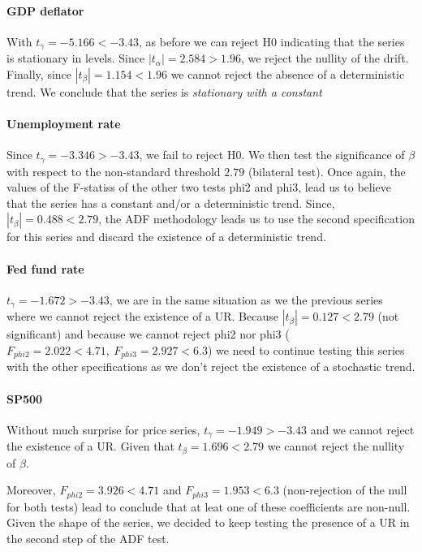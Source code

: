 \documentclass[hidelinks,12pts]{article}
\DeclareMathOperator{\1}{\mathbbm{1}}
\begin{document}
\paragraph{GDP deflator}
With $t_\gamma = -5.166 < -3.43$, as before we can reject H0 indicating that the series is stationary in levels. 
Since $|t_\alpha| = 2.584 > 1.96$, we reject the nullity of the drift. 
Finally, since $|t_\beta| = 1.154 < 1.96$ we cannot reject the absence of a deterministic trend.  
We conclude that the series is \emph{stationary with a constant}


\paragraph{Unemployment rate}
Since $t_\gamma = -3.346 > -3.43$, we fail to reject H0. We then test the significance of $\beta$ with respect to the non-standard threshold $2.79$ (bilateral test).
Once again, the values of the F-statiss of the other two tests phi2 and phi3, lead us to believe that the series has a constant and/or a deterministic trend. 
Since, $|t_\beta| = 0.488 < 2.79$, the ADF methodology leads us to use the second specification for this series and discard the existence of a deterministic trend. 



\paragraph{Fed fund rate}  
$t_\gamma = -1.672 > -3.43$, we are in the same situation as we the previous series where we cannot reject the existence of a UR. 
Because $|t_\beta| = 0.127 < 2.79$ (not significant) and because we cannot reject phi2 nor phi3 ($F_{phi2} = 2.022 <4.71, \: F_{phi3} = 2.927 <6.3$) we need to continue testing this series with the other specifications as we don't reject the existence of a stochastic trend. 


\paragraph{SP500}
Without much surprise for price series, $t_\gamma = -1.949 > -3.43$ and we cannot reject the existence of a UR. 
Given that $t_\beta = 1.696 < 2.79$ we cannot reject the nullity of $\beta$.

Moreover, $F_{phi2} = 3.926< 4.71$ and $F_{phi3} = 1.953 < 6.3$ (non-rejection of the null for both tests) lead to conclude that at leat one of these coefficients are non-null. 
Given the shape of the series, we decided to keep testing the presence of a UR in the second step of the ADF test.
\end{document}
